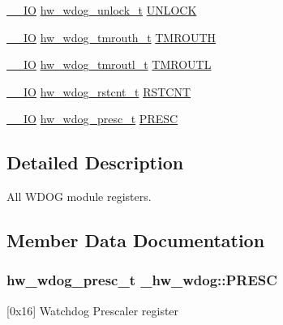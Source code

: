 \begin{DoxyCompactItemize}
\item 
\hyperlink{core__sc300_8h_aec43007d9998a0a0e01faede4133d6be}{\+\_\+\+\_\+\+IO} \hyperlink{union__hw__wdog__unlock}{hw\+\_\+wdog\+\_\+unlock\+\_\+t} \hyperlink{struct__hw__wdog_a0a7523239c13256dca0cefa10aaf1ddf}{U\+N\+L\+O\+CK}
\item 
\hyperlink{core__sc300_8h_aec43007d9998a0a0e01faede4133d6be}{\+\_\+\+\_\+\+IO} \hyperlink{union__hw__wdog__tmrouth}{hw\+\_\+wdog\+\_\+tmrouth\+\_\+t} \hyperlink{struct__hw__wdog_a28d9f9c7d68b307232aeb01899d2093c}{T\+M\+R\+O\+U\+TH}
\item 
\hyperlink{core__sc300_8h_aec43007d9998a0a0e01faede4133d6be}{\+\_\+\+\_\+\+IO} \hyperlink{union__hw__wdog__tmroutl}{hw\+\_\+wdog\+\_\+tmroutl\+\_\+t} \hyperlink{struct__hw__wdog_a3eb9a15868d422dc23a330b4243c02ea}{T\+M\+R\+O\+U\+TL}
\item 
\hyperlink{core__sc300_8h_aec43007d9998a0a0e01faede4133d6be}{\+\_\+\+\_\+\+IO} \hyperlink{union__hw__wdog__rstcnt}{hw\+\_\+wdog\+\_\+rstcnt\+\_\+t} \hyperlink{struct__hw__wdog_a9667b52f07da23bf4f551ef8c10fb17a}{R\+S\+T\+C\+NT}
\item 
\hyperlink{core__sc300_8h_aec43007d9998a0a0e01faede4133d6be}{\+\_\+\+\_\+\+IO} \hyperlink{union__hw__wdog__presc}{hw\+\_\+wdog\+\_\+presc\+\_\+t} \hyperlink{struct__hw__wdog_a3b55bfa05531ede73712d0cd7013e447}{P\+R\+E\+SC}
\end{DoxyCompactItemize}


\subsection{Detailed Description}
All W\+D\+OG module registers. 

\subsection{Member Data Documentation}
\subsubsection[{\texorpdfstring{P\+R\+E\+SC}{PRESC}}]{ {\bf hw\+\_\+wdog\+\_\+presc\+\_\+t} \+\_\+hw\+\_\+wdog\+::\+P\+R\+E\+SC}\hypertarget{struct__hw__wdog_a3b55bfa05531ede73712d0cd7013e447}{}\label{struct__hw__wdog_a3b55bfa05531ede73712d0cd7013e447}
\mbox{[}0x16\mbox{]} Watchdog Prescaler register 
